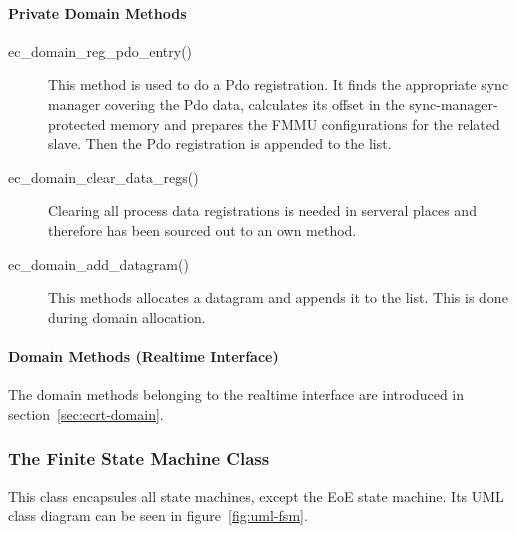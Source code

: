 \documentclass[a4paper,12pt,BCOR6mm,bibtotoc,idxtotoc]{scrbook}
\begin{document}
\paragraph{Private Domain Methods}

\begin{description}
\item[ec\_domain\_reg\_pdo\_entry()] This method is used to do a Pdo
  registration. It finds the appropriate sync manager covering the Pdo
  data, calculates its offset in the sync-manager-protected memory and
  prepares the FMMU configurations for the related slave. Then the Pdo
  registration is appended to the list.
\item[ec\_domain\_clear\_data\_regs()] Clearing all process data
  registrations is needed in serveral places and therefore has been
  sourced out to an own method.
\item[ec\_domain\_add\_datagram()] This methods allocates a datagram
  and appends it to the list. This is done during domain allocation.
\end{description}

\paragraph{Domain Methods (Realtime Interface)}

The domain methods belonging to the realtime interface are introduced
in section~\ref{sec:ecrt-domain}.


\subsubsection{The Finite State Machine Class}
\label{sec:class-fsm}

This class encapsules all state machines, except the EoE state
machine. Its UML class diagram can be seen in
figure~\ref{fig:uml-fsm}.
\end{document}
